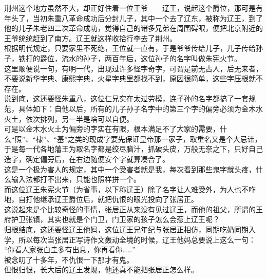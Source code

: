 \begin{multicols}{\theparacolNo}
荆州这个地方虽然不大，却正好住着一位王爷——辽王，说起这个爵位，那可是有年头了，当初朱重八革命成功后分封儿子，其中一个去了辽东，被称为辽王，到了他的儿子朱老四二次革命成功，觉得自己的诸多兄弟在周围碍眼，便把北京附近的王爷统统赶到了南方。辽王就这样收拾行李去了荆州。\\

根据明代规定，只要家里不死绝，王位就一直有，于是爷爷传给儿子，儿子传给孙子，铁打的爵位，流水的孙子，两百年后，这位孙子的名字叫做朱宪火节。\\

这里顺便说一句，有明一代，出现过许多怪字奇字，可谓是前无古人，后无来者，不要说新华字典、康熙字典，火星字典里都找不到，原因很简单，这些字压根就不存在。\\

说到底，这还要怪朱重八，这位仁兄实在太过劳模，连子孙的名字都搞了一套规范，具体如下：自他以后，所有的儿子孙子名字中的第三个字的偏旁必须为金木水火土，依次排列，另一半是啥可以自便。\\

可是以金木水火土为偏旁的字实在有限，根本满足不了大家的需要，什么“照”、“棣”、“基”之类的现成字要先保证皇帝那一家子，取重名又是个大忌讳，于是每一代各地藩王为取名字都是绞尽脑汁，抓破头皮，万般无奈之下，只好自己造字，确定偏旁后，在右边随便安个字就算凑合了。\\

这是一个极为害人的规定，其中一个受害者就是我，每次看到那些鬼字就头疼，什么输入法都打不出来，只能也照样拼一个。\\

而这位辽王朱宪火节（为省事，以下称辽王）除了名字让人难受外，为人也不咋地，自打他继承辽王爵位后，就把仇恨的眼光投向了张居正。\\

这说起来是个比较奇怪的事情，张居正从来没有见过辽王，而他的祖父，所谓的王府护卫张镇，其实也就是个门卫，门卫家的孩子怎么会惹上辽王呢？\\

归根结底，这还要怪辽王他妈，这位辽王兄年纪与张居正相仿，同期吃奶同期入学，所以每次当张居正写诗作文轰动全境的时候，辽王他妈总要说上这么一句：\\

“你看人家张白圭多有出息，你再看你……”\\

被念叨了十多年，不仇恨一下那才有鬼。\\

但恨归恨，长大后的辽王发现，他还真不能把张居正怎么样。\\


\end{multicols}
